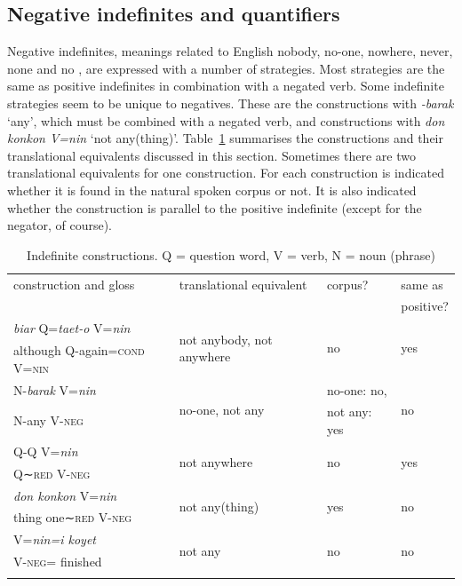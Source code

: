 \documentclass[output=paper,colorlinks,citecolor=brown,draft]{langscibook}
\begin{document}
\subsection{Negative indefinites and quantifiers}
\label{sec:negind}
Negative indefinites, meanings related to English nobody, no-one, nowhere, never, none and no \citep{Haspelmath1997}, are expressed with a number of strategies. Most strategies are the same as positive indefinites in combination with a negated verb. Some indefinite strategies seem to be unique to negatives. These are the constructions with \textit{-barak} `any', which must be combined with a negated verb, and constructions with \textit{don konkon V=nin} `not any(thing)'. Table~\ref{tab:kal:negindef} summarises the constructions and their translational equivalents discussed in this section. Sometimes there are two translational equivalents for one construction. For each construction is indicated whether it is found in the natural spoken corpus or not. It is also indicated whether the construction is parallel to the positive indefinite (except for the negator, of course).


\begin{table} 
	\caption{Indefinite constructions. Q = question word, V = verb, N = noun (phrase)}
	\label{tab:kal:negindef}
	\footnotesize 
	\begin{tabular}{p{45mm}lll}
		\lsptoprule 
		construction and gloss & translational equivalent & corpus? & same as\\
		&&& positive?\\
		\midrule
        \textit{biar} Q=\textit{taet-o} V=\textit{nin} & \multirow{2}{*}{not anybody, not anywhere} & \multirow{2}{*}{no} & \multirow{2}{*}{yes} \\
		although Q-again=\textsc{cond} V=\textsc{nin} &&& \\
\tablevspace
		N-\textit{barak} V=\textit{nin} & \multirow{2}{*}{no-one, not any} & no-one: no, & \multirow{2}{*}{no}\\
		N-any V-\textsc{neg}&&not any: yes&\\
\tablevspace
		Q-Q V=\textit{nin} & \multirow{2}{*}{not anywhere} & \multirow{2}{*}{no} & \multirow{2}{*}{yes}\\
		Q∼\textsc{red} V-\textsc{neg}&&&\\
\tablevspace
		\textit{don konkon} V=\textit{nin} & \multirow{2}{*}{not any(thing)} & \multirow{2}{*}{yes} & \multirow{2}{*}{no}\\
		thing one∼\textsc{red} V-\textsc{neg}&&&\\
\tablevspace
		V=\textit{nin=i koyet} & \multirow{2}{*}{not any} & \multirow{2}{*}{no} & \multirow{2}{*}{no}\\
		 V-\textsc{neg}={\gli} finished&&&\\
		\lspbottomrule	
	\end{tabular}
\end{table}
\end{document}
